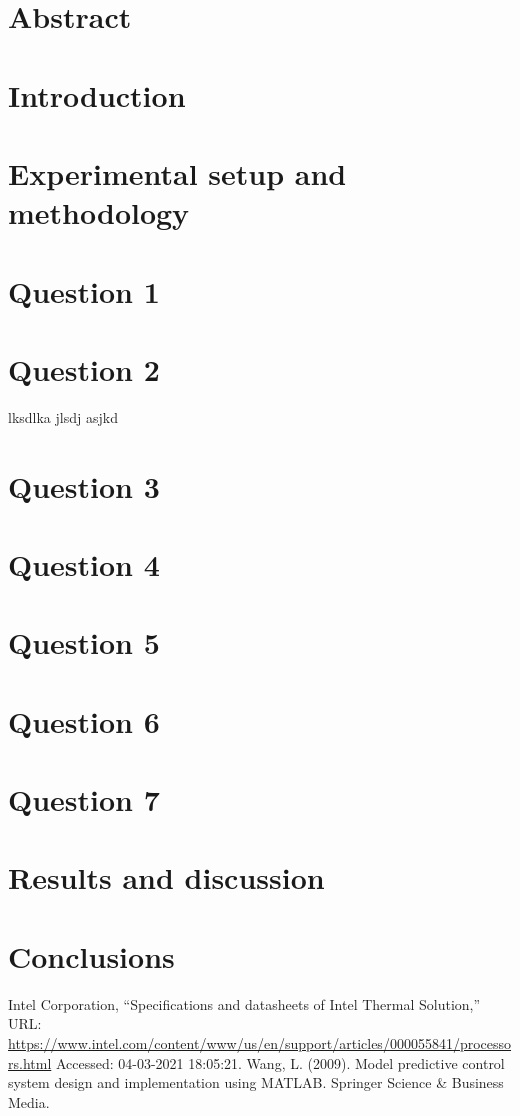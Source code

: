 \documentclass[11pt]{article}
\numberwithin{equation}{section}
\begin{document}
\section{Abstract}
\section*{Introduction}
\section*{Experimental setup and methodology}
\section*{Question 1}
\section*{Question 2}
lksdlka jlsdj asjkd \cite{b2}
\section*{Question 3}
\section*{Question 4}
\section*{Question 5}
\section*{Question 6}
\section*{Question 7}
\section*{Results and discussion}
\section*{Conclusions}
\begin{thebibliography}{00}
     Intel Corporation, ``Specifications and datasheets of Intel\textsuperscript{\tiny\textregistered} Thermal Solution,'' URL: \url{https://www.intel.com/content/www/us/en/support/articles/000055841/processors.html} Accessed: 04-03-2021 18:05:21.
     Wang, L. (2009). Model predictive control system design and implementation using MATLAB\textsuperscript{\tiny\textregistered}. Springer Science \& Business Media.
\end{thebibliography}
\end{document}
